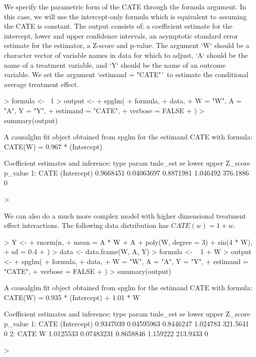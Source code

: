\documentclass[article]{jss}
\begin{document}
We specify the parametric form of the CATE through the formula argument. In this case, we will use the intercept-only formula which is equivalent to assuming the CATE is constant.  The output consists of:
a coefficient estimate for the intercept, lower and upper confidence intervals, an asymptotic standard error estimate for the estimator, a Z-score and p-value. The argument `W` should be a character vector of variable names in data for which to adjust, `A` should be the name of a treatment variable, and `Y` should be the name of an outcome variable. We set the argument `estimand = "CATE"` to estimate the conditional average treatment effect.
\begin{Schunk}
\begin{Sinput}
> formula <- ~1
> output <-
+   spglm(
+     formula,
+     data,
+     W = "W", A = "A", Y = "Y",
+     estimand = "CATE",
+     verbose = FALSE
+   )
> summary(output)
\end{Sinput}
\begin{Soutput}
A causalglm fit object obtained from spglm for the estimand CATE with formula: 
CATE(W) = 0.967 * (Intercept)

Coefficient estimates and inference:
   type       param  tmle_est         se     lower    upper  Z_score p_value
1: CATE (Intercept) 0.9668451 0.04063697 0.8871981 1.046492 376.1886       0
\end{Soutput}
\begin{Sinput}
> 
\end{Sinput}
\end{Schunk}
We can also do a much more complex model with higher dimensional treatment effect interactions. The following data distribution has $CATE(w) = 1 + w$.  
\begin{Schunk}
\begin{Sinput}
> Y <-
+   rnorm(n,
+     mean = A * W + A + poly(W, degree = 3) + sin(4 * W),
+     sd = 0.4
+   )
> data <- data.frame(W, A, Y)
> formula <- ~ 1 + W
> output <-
+   spglm(
+     formula,
+     data,
+     W = "W", A = "A", Y = "Y",
+     estimand = "CATE",
+     verbose = FALSE
+   )
> summary(output)
\end{Sinput}
\begin{Soutput}
A causalglm fit object obtained from spglm for the estimand CATE with formula: 
CATE(W) = 0.935 * (Intercept) + 1.01 * W

Coefficient estimates and inference:
   type       param  tmle_est         se     lower    upper  Z_score p_value
1: CATE (Intercept) 0.9347039 0.04595963 0.8446247 1.024783 321.5641       0
2: CATE           W 1.0125533 0.07483231 0.8658846 1.159222 213.9433       0
\end{Soutput}
\begin{Sinput}
> 
\end{Sinput}
\end{Schunk}
\end{document}
